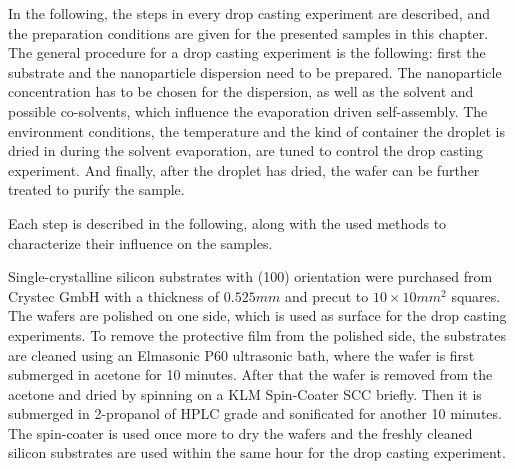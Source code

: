 \documentclass[\main/dresen_thesis.tex]{subfiles}
\begin{document}
  \label{sec:monolayers:nanoparticle:dropcastingExperiments}

  In the following, the steps in every drop casting experiment are described, and the preparation conditions are given for the presented samples in this chapter.
  The general procedure for a drop casting experiment is the following:
  first the substrate and the nanoparticle dispersion need to be prepared.
  The nanoparticle concentration has to be chosen for the dispersion, as well as the solvent and possible co-solvents, which influence the evaporation driven self-assembly.
  The environment conditions, \ie the temperature and the kind of container the droplet is dried in during the solvent evaporation, are tuned to control the drop casting experiment.
  And finally, after the droplet has dried, the wafer can be further treated to purify the sample.

  Each step is described in the following, along with the used methods to characterize their influence on the samples.

    Single-crystalline silicon substrates with (100) orientation were purchased from Crystec GmbH with a thickness of $0.525 \unit{mm}$ and precut to $10 \times 10 \unit{mm^2}$ squares.
    The wafers are polished on one side, which is used as surface for the drop casting experiments.
    To remove the protective film from the polished side, the substrates are cleaned using an Elmasonic P60 ultrasonic bath, where the wafer is first submerged in acetone for 10 minutes.
    After that the wafer is removed from the acetone and dried by spinning on a KLM Spin-Coater SCC briefly. 
    Then it is submerged in 2-propanol of HPLC grade and sonificated for another 10 minutes.
    The spin-coater is used once more to dry the wafers and the freshly cleaned silicon substrates are used within the same hour for the drop casting experiment.
\end{document}
